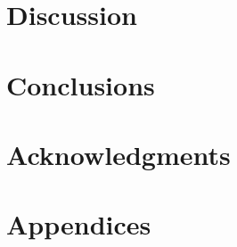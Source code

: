 \documentclass[12pt, titlepage]{article}
\begin{document}


\section{Discussion}



\section{Conclusions}

\section{Acknowledgments}


\section{Appendices}
\end{document}
